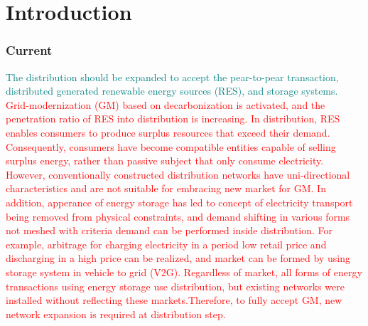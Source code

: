 \documentclass[journal]{IEEEtran} %
\begin{document}
	

\section{Introduction}

\subsubsection{Current}
\textcolor{teal}{The distribution should be expanded to accept the pear-to-pear transaction, distributed generated renewable energy sources (RES), and storage systems.}
\textcolor{red}{Grid-modernization (GM) based on decarbonization is activated, and the penetration ratio of RES into distribution is increasing. In distribution, RES enables consumers to produce surplus resources that exceed their demand. Consequently, consumers have become compatible entities capable of selling surplus energy, rather than passive subject that only consume electricity. However, conventionally constructed distribution networks have uni-directional characteristics and are not suitable for embracing new market for GM. 
In addition, apperance of energy storage has led to concept of electricity transport being removed from physical constraints, and demand shifting in various forms not meshed with criteria demand can be performed inside distribution. For example, arbitrage for charging electricity in a period low retail price and discharging in a high price can be realized, and market can be formed by using storage system in vehicle to grid (V2G). Regardless of market, all forms of energy transactions using energy storage use distribution, but existing networks were installed without reflecting these markets.Therefore, to fully accept GM, new network expansion is required at distribution step.}


\vspace{1in}
\end{document}
